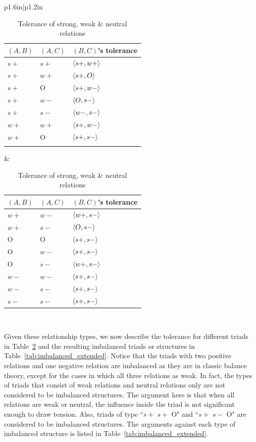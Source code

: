 \begin{table}[htbp!]
\begin{tabular}{p{1.6in}|p{1.2in}}
 \begin{tabular}{p{0.3in}p{0.3in}p{0.5in}} 
$(A,B)$ & $(A,C)$ & $(B,C)$'s tolerance \\ \hline
$s+$ & $s+$ & $\langle s+,w+\rangle$ \\
$s+$ & $w+$ & $\langle s+,O\rangle$  \\
$s+$ & O & $\langle s+,w-\rangle$ \\
$s+$ & $w-$ & $\langle O,s-\rangle$ \\ 
$s+$ & $s-$ &   $\langle w-,s-\rangle$ \\
$w+$ & $w+$ & $\langle s+,w-\rangle$ \\
$w+$ & O & $\langle s+,s-\rangle$ \\
& & 
\end{tabular} &
\begin{tabular}{p{0.3in}p{0.3in}p{0.5in}} 
$(A,B)$ & $(A,C)$ & $(B,C)$'s tolerance \\ \hline
$w+$ & $w-$ & $\langle w+,s-\rangle$ \\
$w+$ & $s-$ & $\langle O,s-\rangle$ \\ 
O & O & $\langle s+,s-\rangle$ \\ 
O & $w-$ & $\langle s+,s-\rangle$ \\ 
O & $s-$ &  $\langle w+,s-\rangle$ \\ 
$w-$ & $w-$ & $\langle s+,s-\rangle$ \\ 
$w-$ & $s-$ & $\langle s+,s-\rangle$ \\ 
$s-$ & $s-$ & $\langle s+,s-\rangle$ \\
\end{tabular}
\end{tabular} \\\vspace{1mm} 
\caption{\label{tab:weak_strong_tolerance}Tolerance of strong, weak \& neutral relations}
\end{table}

Given these relationship types, we now describe the tolerance for
different triads in Table~\ref{tab:weak_strong_tolerance} and the
resulting imbalanced triads or structures in
Table~\ref{tab:imbalanced_extended}. Notice that the triads with
two positive relations and one negative relation are imbalanced as
they are in classic balance theory, except for the cases in which all
three relations as weak. In fact, the types of triads that consist
of weak relations and neutral relations only are not considered to be
imbalanced structures. The argument here is that when all relations
are weak or neutral, the influence inside the triad is not significant
enough to draw tension. Also, triads of type ``$s+$ $s+$ O" and
``$s+$ $s-$ O" are considered to be imbalanced structures. The
arguments against each type of imbalanced structure is listed in
Table~\ref{tab:imbalanced_extended}.


